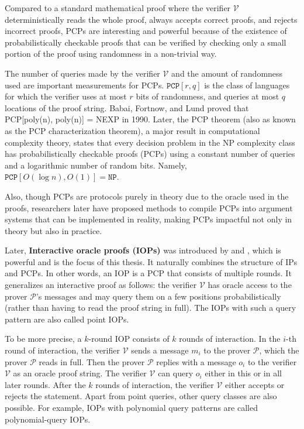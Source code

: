 Compared to a standard mathematical proof where the verifier $\mathcal{V}$ deterministically reads the whole proof, always accepts correct proofs, and rejects incorrect proofs, 
PCPs are interesting and powerful because of the existence of probabilistically checkable proofs that can be verified by checking only a small portion of the proof using randomness in a non-trivial way.

The number of queries made by the verifier $\mathcal{V}$ and the amount of randomness used are important measurements for PCPs. $\texttt{PCP}[r, q]$ is the class of languages for which the verifier uses at most $r$ bits of randomness, and queries at most $q$ locations of the proof string.
Babai, Fortnow, and Lund \cite{DBLP:conf/focs/BabaiFL90} proved that PCP[poly(n), poly(n)] = NEXP in 1990. 
Later, the PCP theorem (also as known as the PCP characterization theorem), 
a major result in computational complexity theory, 
states that every decision problem in the NP complexity class has probabilistically checkable proofs (PCPs) using a constant number of queries and a logarithmic number of random bits.
Namely, $\texttt{PCP}[O(\log n), O(1)] = \texttt{NP}$.

Also, though PCPs are protocols purely in theory due to the oracle used in the proofs, researchers later have proposed methods \cite{DBLP:conf/stoc/Kilian92} to compile PCPs into argument systems that can be implemented in reality, making PCPs impactful not only in theory but also in practice. 

Later, \textbf{Interactive oracle proofs (IOPs)} was introduced by \cite{DBLP:conf/tcc/Ben-SassonCS16} and \cite{DBLP:journals/jacm/KalaiRR22}, which is powerful and is the focus of this thesis. It naturally combines the structure of IPs and PCPs.
In other words, an IOP is a PCP that consists of multiple rounds. It generalizes an interactive proof as follows:
the verifier $\mathcal{V}$ has oracle access to the prover $\mathcal{P}$’s messages and may query them on a few positions probabilistically (rather than having to read the proof string in full). The IOPs with such a query pattern are also called point IOPs.

To be more precise, a $k$-round IOP consists of $k$ rounds of interaction. In the $i$-th round of interaction, the verifier $\mathcal{V}$ sends a message $m_i$ to the prover $\mathcal{P}$, which the prover $\mathcal{P}$ reads in full. 
Then the prover $\mathcal{P}$ replies with a message $o_i$ to the verifier $\mathcal{V}$ as an oracle proof string.
The verifier $\mathcal{V}$ can query $o_i$ either in this or in all later rounds. 
After the $k$ rounds of interaction, the verifier $\mathcal{V}$ either accepts or rejects the statement.
Apart from point queries, other query classes are also possible.
For example, IOPs with polynomial query patterns are called polynomial-query IOPs.

